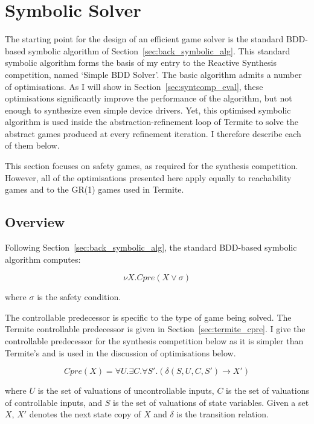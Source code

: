\section{Symbolic Solver}
\label{sec:syntcomp}

The starting point for the design of an efficient game solver is the standard BDD-based symbolic algorithm of Section~\ref{sec:back_symbolic_alg}. This standard symbolic algorithm forms the basis of my entry to the Reactive Synthesis competition, named `Simple BDD Solver'. The basic algorithm admits a number of optimisations. As I will show in Section~\ref{sec:syntcomp_eval}, these optimisations significantly improve the performance of the algorithm, but not enough to synthesize even simple device drivers. Yet, this optimised symbolic algorithm is used inside the abstraction-refinement loop of Termite to solve the abstract games produced at every refinement iteration. I therefore describe each of them below.

This section focuses on safety games, as required for the synthesis competition. However, all of the optimisations presented here apply equally to reachability games and to the GR(1) games used in Termite. 

\subsection{Overview}
Following Section~\ref{sec:back_symbolic_alg}, the standard BDD-based symbolic algorithm computes:

\begin{equation}
\label{eqn:mu_syntcomp}
\nu X. Cpre(X \lor \sigma)
\end{equation}

\noindent where $\sigma$ is the safety condition.

The controllable predecessor is specific to the type of game being solved. The Termite controllable predecessor is given in Section~\ref{sec:termite_cpre}. I give the controllable predecessor for the synthesis competition below as it is simpler than Termite's and is used in the discussion of optimisations below.

\begin{equation}
\label{eqn:cpre_syntcomp}
Cpre(X) = \forall U. \exists C. \forall S'. (\delta(S, U, C, S') \rightarrow X')
\end{equation}

\noindent where $U$ is the set of valuations of uncontrollable inputs, $C$ is the set of valuations of controllable inputs, and $S$ is the set of valuations of state variables. Given a set $X$, $X'$ denotes the next state copy of $X$ and $\delta$ is the transition relation.


